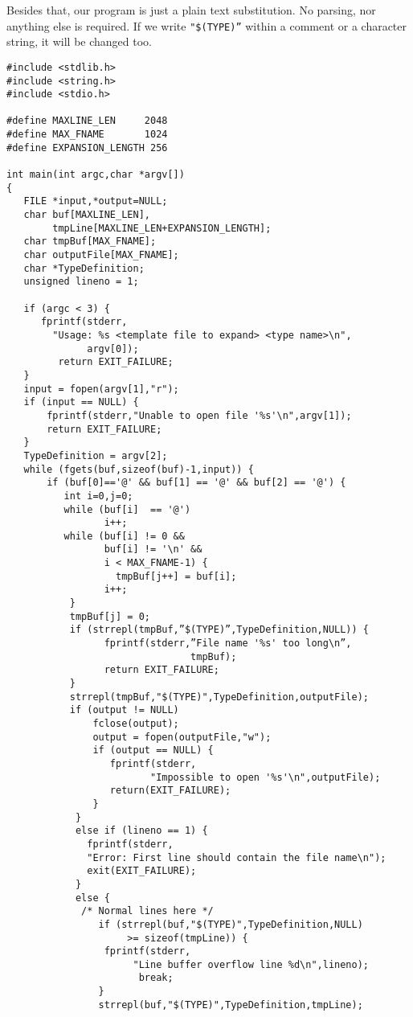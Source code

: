 \documentclass[12pt,a4paper]{memoir} %
\begin{document}
{{Besides that, our program is just a plain text substitution. No parsing, nor anything else is required. If we write \texttt{"\$(TYPE)”} within a comment or a character string, it will be changed too.
\begin{verbatim}
#include <stdlib.h>
#include <string.h>
#include <stdio.h>

#define MAXLINE_LEN     2048
#define MAX_FNAME       1024
#define EXPANSION_LENGTH 256

int main(int argc,char *argv[])
{
   FILE *input,*output=NULL;
   char buf[MAXLINE_LEN],
        tmpLine[MAXLINE_LEN+EXPANSION_LENGTH];
   char tmpBuf[MAX_FNAME];
   char outputFile[MAX_FNAME];
   char *TypeDefinition;
   unsigned lineno = 1;

   if (argc < 3) {
      fprintf(stderr,
        "Usage: %s <template file to expand> <type name>\n",
              argv[0]);
         return EXIT_FAILURE;
   }
   input = fopen(argv[1],"r");
   if (input == NULL) {
       fprintf(stderr,"Unable to open file '%s'\n",argv[1]);
       return EXIT_FAILURE;
   }
   TypeDefinition = argv[2];
   while (fgets(buf,sizeof(buf)-1,input)) {
       if (buf[0]=='@' && buf[1] == '@' && buf[2] == '@') {
          int i=0,j=0;
          while (buf[i]  == '@')
                 i++;
          while (buf[i] != 0 && 
                 buf[i] != '\n' && 
                 i < MAX_FNAME-1) {
                   tmpBuf[j++] = buf[i];
                 i++;
           }
           tmpBuf[j] = 0;
           if (strrepl(tmpBuf,”$(TYPE)”,TypeDefinition,NULL)) {
                 fprintf(stderr,”File name '%s' too long\n”,
                                tmpBuf);
                 return EXIT_FAILURE;
           }
           strrepl(tmpBuf,"$(TYPE)",TypeDefinition,outputFile);
           if (output != NULL)
               fclose(output);
               output = fopen(outputFile,"w");
               if (output == NULL) {
                  fprintf(stderr,
                         "Impossible to open '%s'\n",outputFile);
                  return(EXIT_FAILURE);
               }
            }
            else if (lineno == 1) {
              fprintf(stderr,
              "Error: First line should contain the file name\n");
              exit(EXIT_FAILURE);
            }
            else {
             /* Normal lines here */
                if (strrepl(buf,"$(TYPE)",TypeDefinition,NULL) 
                     >= sizeof(tmpLine)) {
                 fprintf(stderr,
                      "Line buffer overflow line %d\n",lineno);
                       break;
                }
                strrepl(buf,"$(TYPE)",TypeDefinition,tmpLine);

\end{verbatim}}}
\end{document}
